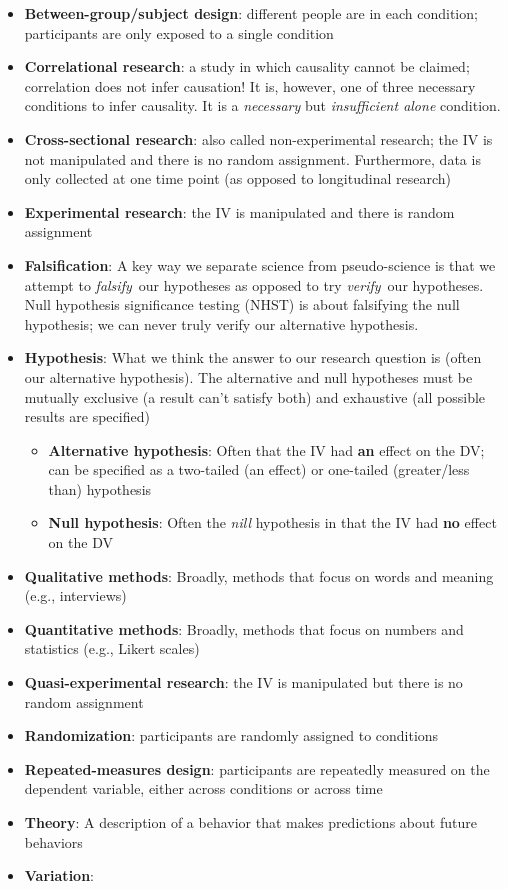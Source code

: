 \documentclass[
]{book}
\begin{document}
\begin{itemize}
\item
  \textbf{Between-group/subject design}: different people are in each condition; participants are only exposed to a single condition
\item
  \textbf{Correlational research}: a study in which causality cannot be claimed; correlation does not infer causation! It is, however, one of three necessary conditions to infer causality. It is a \emph{necessary} but \emph{insufficient alone} condition.
\item
  \textbf{Cross-sectional research}: also called non-experimental research; the IV is not manipulated and there is no random assignment. Furthermore, data is only collected at one time point (as opposed to longitudinal research)
\item
  \textbf{Experimental research}: the IV is manipulated and there is random assignment
\item
  \textbf{Falsification}: A key way we separate science from pseudo-science is that we attempt to \emph{falsify}~our hypotheses as opposed to try \emph{verify}~our hypotheses. Null hypothesis significance testing (NHST) is about falsifying the null hypothesis; we can never truly verify our alternative hypothesis.
\item
  \textbf{Hypothesis}: What we think the answer to our research question is (often our alternative hypothesis). The alternative and null hypotheses must be mutually exclusive (a result can't satisfy both) and exhaustive (all possible results are specified)

  \begin{itemize}
  \item
    \textbf{Alternative hypothesis}: Often that the IV had \textbf{an} effect on the DV; can be specified as a two-tailed (an effect) or one-tailed (greater/less than) hypothesis
  \item
    \textbf{Null hypothesis}: Often the \emph{nill} hypothesis in that the IV had \textbf{no} effect on the DV
  \end{itemize}
\item
  \textbf{Qualitative methods}: Broadly, methods that focus on words and meaning (e.g., interviews)
\item
  \textbf{Quantitative methods}: Broadly, methods that focus on numbers and statistics (e.g., Likert scales)
\item
  \textbf{Quasi-experimental research}: the IV is manipulated but there is no random assignment
\item
  \textbf{Randomization}: participants are randomly assigned to conditions
\item
  \textbf{Repeated-measures design}: participants are repeatedly measured on the dependent variable, either across conditions or across time
\item
  \textbf{Theory}: A description of a behavior that makes predictions about future behaviors
\item
  \textbf{Variation}:


\end{itemize}
\end{document}
